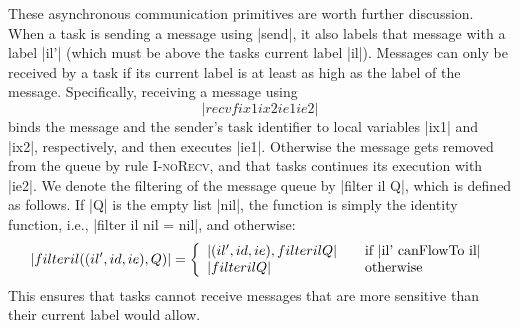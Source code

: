 These asynchronous communication primitives are worth further
discussion.  When a task is sending a message using |send|, it also labels that
message with a label |il'| (which must be above the tasks current label |il|).
Messages can only be received by a task if its current label is
at least as high as the label of the message.
Specifically, receiving a message using
\[ |recvf ix1 ix2 ie1 ie2| \]
binds the message and the sender's task identifier
to local variables |ix1| and |ix2|, respectively, and then executes |ie1|.
Otherwise the message gets removed from the queue by rule \textsc{I-noRecv},
and that tasks continues its execution with |ie2|.
We denote the filtering of the message queue by |filter il Q|,
which is defined as follows.
If |Q| is the empty list |nil|, the
function is simply the identity function, i.e.,
|filter il nil = nil|, and otherwise:
\[
|filter il ((il', id, ie) , Q )| = \left\{
\begin{array}{l l}
|(il', id, ie) , filter il Q| & \quad \text{if |il' canFlowTo il|}\\
|filter il Q| & \quad \text{otherwise}
\end{array} \right.
\]
This ensures that tasks cannot receive messages that are more sensitive
than their current label would allow.

